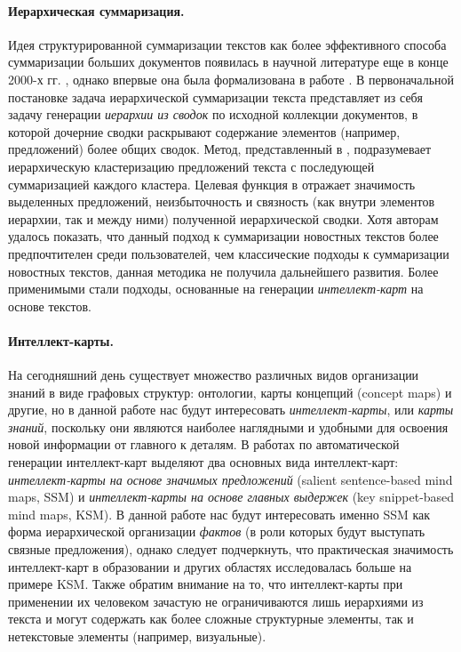 \documentclass[12pt]{article}
\begin{document}
\paragraph{Иерархическая суммаризация.} Идея структурированной суммаризации текстов как более эффективного способа суммаризации больших документов появилась в научной литературе еще в конце 2000-х гг. \cite{yang2008hierarchical}, однако впервые она была формализована в работе \cite{christensen2014hierarchical}. В первоначальной постановке задача иерархической суммаризации текста представляет из себя задачу генерации \textit{иерархии из сводок} по исходной коллекции документов, в которой дочерние сводки раскрывают содержание элементов (например, предложений) более общих сводок. Метод, представленный в \cite{christensen2014hierarchical}, подразумевает иерархическую кластеризацию предложений текста с последующей суммаризацией каждого кластера. Целевая функция в \cite{christensen2014hierarchical} отражает значимость выделенных предложений, неизбыточность и связность (как внутри элементов иерархии, так и между ними) полученной иерархической сводки. Хотя авторам удалось показать, что данный подход к суммаризации новостных текстов более предпочтителен среди пользователей, чем классические подходы к суммаризации новостных текстов, данная методика не получила дальнейшего развития. Более применимыми стали подходы, основанные на генерации \textit{интеллект-карт} на основе текстов.

\paragraph{Интеллект-карты.} На сегодняшний день существует множество различных видов организации знаний в виде графовых структур: онтологии, карты концепций (concept maps) и другие, но в данной работе нас будут интересовать \textit{интеллект-карты}, или \textit{карты знаний}, поскольку они являются наиболее наглядными и удобными для освоения новой информации от главного к деталям. В работах по автоматической генерации интеллект-карт выделяют два основных вида интеллект-карт: \textit{интеллект-карты на основе значимых предложений} (salient sentence-based mind maps, SSM) и \textit{интеллект-карты на основе главных выдержек} (key snippet-based mind maps, KSM). В данной работе нас будут интересовать именно SSM как форма иерархической организации \textit{фактов} (в роли которых будут выступать связные предложения), однако следует подчеркнуть, что практическая значимость интеллект-карт в образовании и других областях исследовалась больше на примере KSM. Также обратим внимание на то, что интеллект-карты при применении их человеком зачастую не ограничиваются лишь иерархиями из текста и могут содержать как более сложные структурные элементы, так и нетекстовые элементы (например, визуальные).
\end{document}

